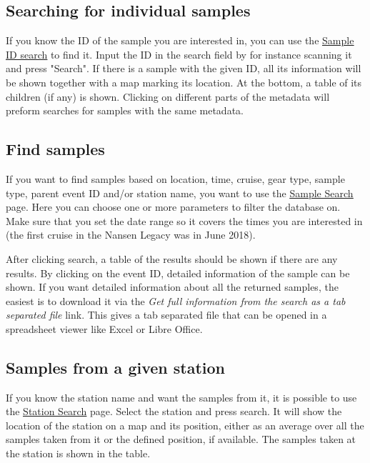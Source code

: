 \documentclass[a4paper,english, 11pt]{article}
\begin{document}
\subsection{Searching for individual samples} %
\label{sub:search_ind}

If you know the ID of the sample you are interested in, you can use the \href{https://www.sios-svalbard.org/reports/ind_sample}{\color{blue}\underline{Sample ID search}} to find it. Input the ID in the search field by for instance scanning it and press "Search". If there is a sample with the given ID, all its information will be shown together with a map marking its location. At the bottom, a table of its children (if any) is shown. Clicking on different parts of the metadata will preform searches for samples with the same metadata. 


\subsection{Find samples} %
\label{sub:find_samples}

If you want to find samples based on location, time, cruise, gear type, sample type, parent event ID and/or station name, you want to use the \href{https://sios-svalbard.org/reports/aen_multi}{\color{blue}\underline{Sample Search}} page. Here you can choose one or more parameters to filter the database on. Make sure that you set the date range so it covers the times you are interested in (the first cruise in the Nansen Legacy was in June 2018).

After clicking search, a table of the results should be shown if there are any results. By clicking on the event ID, detailed information of the sample can be shown. If you want detailed information about all the returned samples, the easiest is to download it via the \emph{Get full information from the search as a tab separated file} link. This gives a tab separated file that can be opened in a spreadsheet viewer like Excel or Libre Office. 

\subsection{Samples from a given station} %
\label{sub:station_search}

If you know the station name and want the samples from it, it is possible to use the \href{https://www.sios-svalbard.org/reports/aen_station}{\color{blue}\underline{Station Search}} page. Select the station and press search. It will show the location of the station on a map and its position, either as an average over all the samples taken from it or the defined position, if available. The samples taken at the station is shown in the table.
\end{document}
